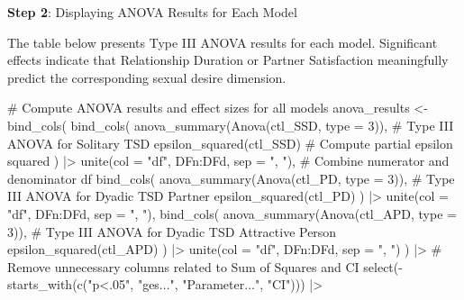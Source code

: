 \documentclass[
  bookmarksnumbered]{article}
\newenvironment{Shaded}{\begin{snugshade}}{\end{snugshade}}
\newcommand{\AttributeTok}[1]{\textcolor[rgb]{0.80,0.80,0.80}{#1}}
\newcommand{\CommentTok}[1]{\textcolor[rgb]{0.50,0.62,0.50}{#1}}
\newcommand{\DecValTok}[1]{\textcolor[rgb]{0.86,0.86,0.80}{#1}}
\newcommand{\FunctionTok}[1]{\textcolor[rgb]{0.94,0.94,0.56}{#1}}
\newcommand{\NormalTok}[1]{\textcolor[rgb]{0.80,0.80,0.80}{#1}}
\newcommand{\OtherTok}[1]{\textcolor[rgb]{0.94,0.94,0.56}{#1}}
\newcommand{\SpecialCharTok}[1]{\textcolor[rgb]{0.86,0.64,0.64}{#1}}
\newcommand{\StringTok}[1]{\textcolor[rgb]{0.80,0.58,0.58}{#1}}
\begin{document}
\textbf{Step 2}: Displaying ANOVA Results for Each Model

The table below presents Type III ANOVA results for each model. Significant effects indicate that Relationship Duration or Partner Satisfaction meaningfully predict the corresponding sexual desire dimension.

\begin{Shaded}
\begin{Highlighting}[]
\CommentTok{\# Compute ANOVA results and effect sizes for all models}
\NormalTok{anova\_results }\OtherTok{\textless{}{-}} \FunctionTok{bind\_cols}\NormalTok{(}
  \FunctionTok{bind\_cols}\NormalTok{(}
    \FunctionTok{anova\_summary}\NormalTok{(}\FunctionTok{Anova}\NormalTok{(ctl\_SSD, }\AttributeTok{type =} \DecValTok{3}\NormalTok{)), }\CommentTok{\# Type III ANOVA for Solitary TSD}
    \FunctionTok{epsilon\_squared}\NormalTok{(ctl\_SSD) }\CommentTok{\# Compute partial epsilon squared}
\NormalTok{  ) }\SpecialCharTok{|\textgreater{}}
    \FunctionTok{unite}\NormalTok{(}\AttributeTok{col =} \StringTok{"df"}\NormalTok{, DFn}\SpecialCharTok{:}\NormalTok{DFd, }\AttributeTok{sep =} \StringTok{", "}\NormalTok{), }\CommentTok{\# Combine numerator and denominator df}
  \FunctionTok{bind\_cols}\NormalTok{(}
    \FunctionTok{anova\_summary}\NormalTok{(}\FunctionTok{Anova}\NormalTok{(ctl\_PD, }\AttributeTok{type =} \DecValTok{3}\NormalTok{)), }\CommentTok{\# Type III ANOVA for Dyadic TSD Partner}
    \FunctionTok{epsilon\_squared}\NormalTok{(ctl\_PD)}
\NormalTok{  ) }\SpecialCharTok{|\textgreater{}}
    \FunctionTok{unite}\NormalTok{(}\AttributeTok{col =} \StringTok{"df"}\NormalTok{, DFn}\SpecialCharTok{:}\NormalTok{DFd, }\AttributeTok{sep =} \StringTok{", "}\NormalTok{),}
  \FunctionTok{bind\_cols}\NormalTok{(}
    \FunctionTok{anova\_summary}\NormalTok{(}\FunctionTok{Anova}\NormalTok{(ctl\_APD, }\AttributeTok{type =} \DecValTok{3}\NormalTok{)), }\CommentTok{\# Type III ANOVA for Dyadic TSD Attractive Person}
    \FunctionTok{epsilon\_squared}\NormalTok{(ctl\_APD)}
\NormalTok{  ) }\SpecialCharTok{|\textgreater{}}
    \FunctionTok{unite}\NormalTok{(}\AttributeTok{col =} \StringTok{"df"}\NormalTok{, DFn}\SpecialCharTok{:}\NormalTok{DFd, }\AttributeTok{sep =} \StringTok{", "}\NormalTok{)}
\NormalTok{) }\SpecialCharTok{|\textgreater{}}
  \CommentTok{\# Remove unnecessary columns related to Sum of Squares and CI}
  \FunctionTok{select}\NormalTok{(}\SpecialCharTok{{-}}\FunctionTok{starts\_with}\NormalTok{(}\FunctionTok{c}\NormalTok{(}\StringTok{"p\textless{}.05"}\NormalTok{, }\StringTok{"ges..."}\NormalTok{, }\StringTok{"Parameter..."}\NormalTok{, }\StringTok{"CI"}\NormalTok{))) }\SpecialCharTok{|\textgreater{}}

\end{Highlighting}
\end{Shaded}
\end{document}
